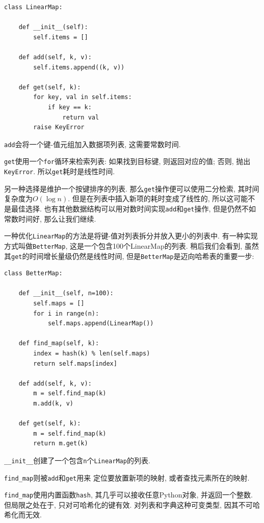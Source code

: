 \documentclass[10pt]{book}
\begin{document}
\begin{verbatim}
class LinearMap:

    def __init__(self):
        self.items = []

    def add(self, k, v):
        self.items.append((k, v))

    def get(self, k):
        for key, val in self.items:
            if key == k:
                return val
        raise KeyError
\end{verbatim}

{\tt add}会将一个键-值元组加入数据项列表, 这需要常数时间.

{\tt get}使用一个{\tt for}循环来检索列表:
如果找到目标键, 则返回对应的值;
否则, 抛出{\tt KeyError}.
所以{\tt get}耗时是线性时间.

另一种选择是维护一个按键排序的列表.
那么{\tt get}操作便可以使用二分检索, 其时间复杂度为$O(\log n)$.
但是在列表中插入新项的耗时变成了线性的,
所以这可能不是最佳选择.
也有其他数据结构可以用对数时间实现{\tt add}和{\tt get}操作,
但是仍然不如常数时间好, 那么让我们继续.

一种优化{\tt LinearMap}的方法是将键-值对列表拆分并放入更小的列表中. 
有一种实现方式叫做{\tt BetterMap}, 这是一个包含100个LinearMap的列表.
稍后我们会看到, 虽然其{\tt get}的时间增长量级仍然是线性时间,
但是{\tt BetterMap}是迈向哈希表的重要一步:

\begin{verbatim}
class BetterMap:

    def __init__(self, n=100):
        self.maps = []
        for i in range(n):
            self.maps.append(LinearMap())

    def find_map(self, k):
        index = hash(k) % len(self.maps)
        return self.maps[index]

    def add(self, k, v):
        m = self.find_map(k)
        m.add(k, v)

    def get(self, k):
        m = self.find_map(k)
        return m.get(k)
\end{verbatim}

\verb"__init__"创建了一个包含{\tt n}个{\tt LinearMap}的列表.

\verb"find_map"则被{\tt add}和{\tt get}用来
定位要放置新项的映射, 或者查找元素所在的映射.

\verb"find_map"使用内置函数{\tt hash}, 其几乎可以接收任意Python对象, 
并返回一个整数.
但局限之处在于, 只对可哈希化的键有效. 对列表和字典这种可变类型, 因其不可哈希化而无效.
\end{document}
